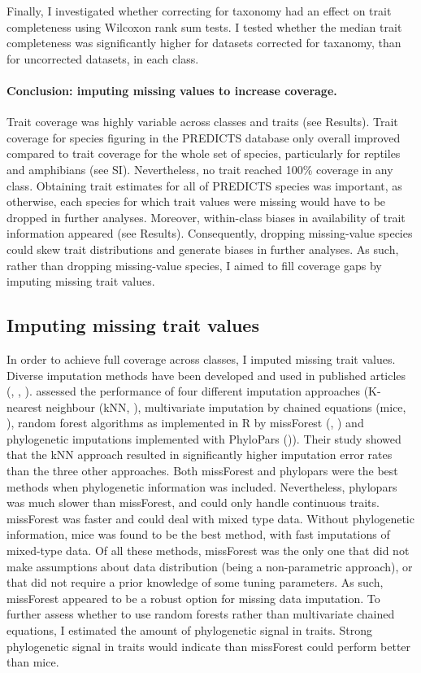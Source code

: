 Finally, I investigated whether correcting for taxonomy had an effect on trait completeness using Wilcoxon rank sum tests. I tested whether the median trait completeness was significantly higher for datasets corrected for taxanomy, than for uncorrected datasets, in each class.

\paragraph{Conclusion: imputing missing values to increase coverage.}
Trait coverage was highly variable across classes and traits (see Results). Trait coverage for species figuring in the PREDICTS database only overall improved compared to trait coverage for the whole set of species, particularly for reptiles and amphibians (see SI). Nevertheless, no trait reached 100\% coverage in any class. Obtaining trait estimates for all of PREDICTS species was important, as otherwise, each species for which trait values were missing would have to be dropped in further analyses. Moreover, within-class biases in availability of trait information appeared (see Results). Consequently, dropping missing-value species could skew trait distributions and generate biases in further analyses. As such, rather than dropping missing-value species, I aimed to fill coverage gaps by imputing missing trait values. 

\subsection{Imputing missing trait values}
In order to achieve full coverage across classes, I imputed missing trait values. Diverse imputation methods have been developed and used in published articles (\cite{Cooke2019}, \cite{Molina-Venegas2018a}, \cite{Swenson2014}). \cite{Penone2014} assessed the performance of four different imputation approaches (K-nearest neighbour (kNN, \cite{Troyanskaya2001}), multivariate imputation by chained equations (mice, \cite{mice}), random forest algorithms as implemented in R by missForest (\cite{Stekhoven2012}, \cite{Stekhoven2016}) and phylogenetic imputations implemented with PhyloPars (\cite{Bruggeman2009})). Their study showed that the kNN approach resulted in significantly higher imputation error rates than the three other approaches. Both missForest and phylopars were the best methods when phylogenetic information was included. Nevertheless, phylopars was much slower than missForest, and could only handle continuous traits. missForest was faster and could deal with mixed type data. Without phylogenetic information, mice was found to be the best method, with fast imputations of mixed-type data. Of all these methods, missForest was the only one that did not make assumptions about data distribution (being a non-parametric approach), or that did not require a prior knowledge of some tuning parameters. As such, missForest appeared to be a robust option for missing data imputation. To further assess whether to use random forests rather than multivariate chained equations, I estimated the amount of phylogenetic signal in traits. Strong phylogenetic signal in traits would indicate than missForest could perform better than mice.

